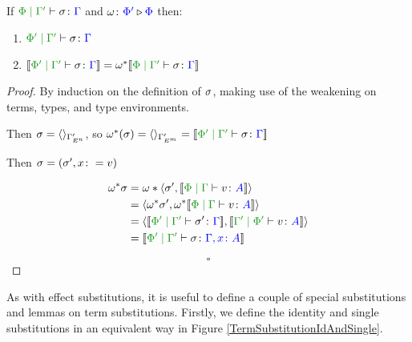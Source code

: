 \documentclass{Report}
\begin{document}
\begin{framed}
    \begin{theorem}\label{EffectWeakeningOnTermSubstitution}
        If $\etyperelation{\P}{\G'}{\si}{\G}$ and $\omega \colon {\color{blue}\Phi'} \triangleright {\color {blue} \Phi}$ then:
        
        \begin{enumerate}[label=\roman*.]
            \item $\etyperelation{\P'}{\G'}{\si}{\G}$
            \item $\deno{\etyperelation{\P'}{\G'}{\si}{\G}} = \w\star\deno{\etyperelation{\P}{\G'}{\si}{\G}}$
        \end{enumerate}
    \end{theorem}
    
    
    \begin{proof}
        By induction on the definition of $\sigma$, making use of the weakening on terms, types, and type environments.
    
        \case{\tsubnil}
        Then $\sigma = \langle\rangle_{\Gamma'_{E^n}}$, so $\w\star(\si) = \term{\G'_{E^m}} = \deno{\etyperelation{\P'}{\G'}{\si}{\G}}$
        
        \case{\tsubextend}
        Then $\sigma = (\sigma',x\colon= v)$
        
        \begin{align*}
            \w\star\si & = \w*\pr{\si'}{\deno{\gpetyperelation{v}{A}}}\\
            & = \pr{\w\star\si'}{\w\star\deno{\gpetyperelation{v}{A}}}\\
            &=\pr{\deno{\etyperelation{\P'}{\G'}{\si'}{\G}}}{\deno{\etyperelation{\G'}{\P'}{v}{A}}}\\
            &=\deno{\etyperelation{\P'}{\G'}{\si}{\gax}}
        \end{align*}
    
        $$\square$$
    
    \end{proof}
\end{framed}

As with effect substitutions, it is useful to define a couple of special substitutions and lemmas on term substitutions. Firstly, we define the identity and single substitutions in an equivalent way in Figure \ref{TermSubstitutionIdAndSingle}.
\end{document}
